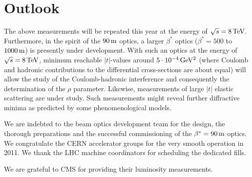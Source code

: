 \documentclass[doublecol]{epl/epl2}
\def\un#1{\,{\rm #1}}
\begin{document}
\section{Outlook}

The above measurements will be repeated this year at the energy of $\sqrt s = 8\un{TeV}$. Furthermore, in the spirit of the $90\un{m}$ optics, a larger $\beta^*$ optics ($\beta^* = 500$ to $1000\un{m}$) is presently under development. With such an optics at the energy of $\sqrt s = 8\un{TeV}$, minimum reachable $|t|$-values around  $5\cdot 10^{-4}\un{GeV^2}$ (where Coulomb and hadronic contributions to the differential cross-sections are about equal) will allow the study of the Coulomb-hadronic interference and consequently the determination of the $\rho$ parameter. Likewise, measurements of large $|t|$ elastic scattering are under study. Such measurements might reveal further diffractive minima as predicted by some phenomenological models.



\acknowledgments

We are indebted to the beam optics development team
for the design, the thorough preparations and the successful commissioning of the $\beta^* = 90\un{m}$ optics. We congratulate the CERN accelerator groups for the very smooth operation in 2011. We thank
the LHC machine coordinators for scheduling the dedicated fills.

We are grateful to CMS for providing their luminosity measurements.
\end{document}

